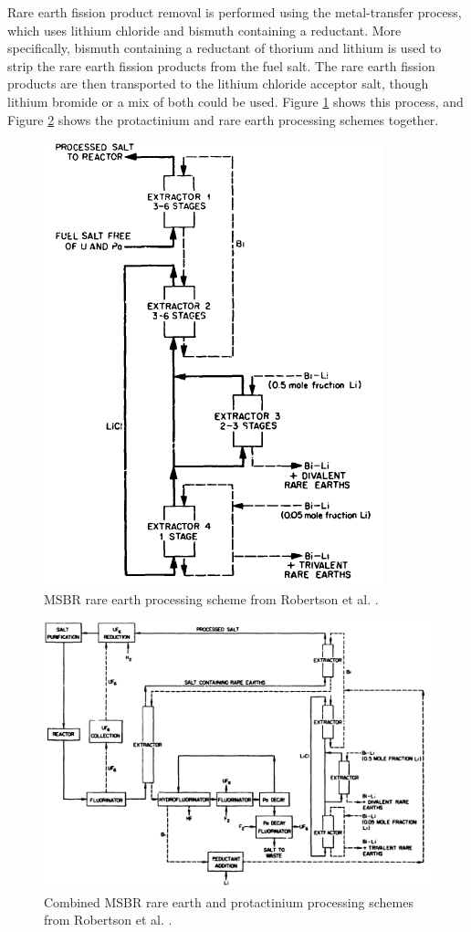 Rare earth fission product removal is performed using the metal-transfer process, which uses lithium chloride and bismuth containing a reductant. More specifically, bismuth containing a reductant of thorium and lithium is used to strip the rare earth fission products from the fuel salt. The rare earth fission products are then transported to the lithium chloride acceptor salt, though lithium bromide or a mix of both could be used. Figure \ref{fig:msbr_re} shows this process, and Figure \ref{fig:msbr_re_pa} shows the protactinium and rare earth processing schemes together.

\begin{figure}[H]
  \centering
  \includegraphics[scale=0.65]{images/msbr_re_robertson.PNG}
  \caption{MSBR rare earth processing scheme from Robertson et al. \cite{robertson_conceptual_1971}.}
   \label{fig:msbr_re}
\end{figure}

\begin{figure}[H]
  \centering
  \includegraphics[scale=0.75]{images/msbr_flows_robertson.PNG}
  \caption{Combined MSBR rare earth and protactinium processing schemes from Robertson et al. \cite{robertson_conceptual_1971}.}
   \label{fig:msbr_re_pa}
\end{figure}

